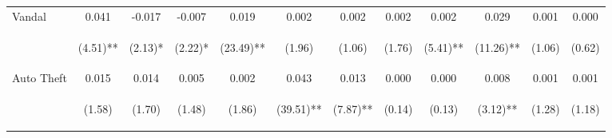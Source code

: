 \begin{tabular}{lccccccccccc}
\noalign{\smallskip}Vandal & 0.041 & -0.017 & -0.007 & 0.019 & 0.002 & 0.002 & 0.002 & 0.002 & 0.029 & 0.001 & 0.000\\
 & \begin{footnotesize}(4.51)**\end{footnotesize} & \begin{footnotesize}(2.13)*\end{footnotesize} & \begin{footnotesize}(2.22)*\end{footnotesize} & \begin{footnotesize}(23.49)**\end{footnotesize} & \begin{footnotesize}(1.96)\end{footnotesize} & \begin{footnotesize}(1.06)\end{footnotesize} & \begin{footnotesize}(1.76)\end{footnotesize} & \begin{footnotesize}(5.41)**\end{footnotesize} & \begin{footnotesize}(11.26)**\end{footnotesize} & \begin{footnotesize}(1.06)\end{footnotesize} & \begin{footnotesize}(0.62)\end{footnotesize}\\
\noalign{\smallskip}Auto Theft & 0.015 & 0.014 & 0.005 & 0.002 & 0.043 & 0.013 & 0.000 & 0.000 & 0.008 & 0.001 & 0.001\\
 & \begin{footnotesize}(1.58)\end{footnotesize} & \begin{footnotesize}(1.70)\end{footnotesize} & \begin{footnotesize}(1.48)\end{footnotesize} & \begin{footnotesize}(1.86)\end{footnotesize} & \begin{footnotesize}(39.51)**\end{footnotesize} & \begin{footnotesize}(7.87)**\end{footnotesize} & \begin{footnotesize}(0.14)\end{footnotesize} & \begin{footnotesize}(0.13)\end{footnotesize} & \begin{footnotesize}(3.12)**\end{footnotesize} & \begin{footnotesize}(1.28)\end{footnotesize} & \begin{footnotesize}(1.18)\end{footnotesize}\\

\end{tabular}
